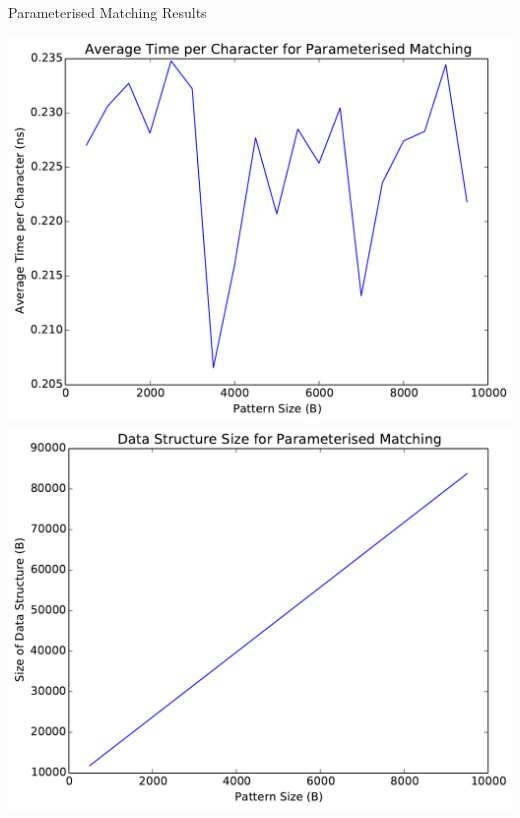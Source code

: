 \documentclass[ %
                    author={Dominic Moylett},
                supervisor={Dr. Raphael Clifford, Dr. Markus Jalsenius and Dr. Benjamin Sach},
                     title={An Empirical Analysis of Data Streaming Algorithms},
                  subtitle={},
                    degree={MEng},
                      year={2014} ]{poster}
\begin{document}
\begin{frame}{}
\begin{columns}[t]
  \begin{column}{0.422\linewidth}
  \begin{block}{\Large Parameterised Matching Results}
  \begin{center}
  \includegraphics[scale=0.6]{parameterised_run_time}\includegraphics[scale=0.6]{parameterised_size}
  \end{center}
  \end{block}
  \end{column}


\end{columns}
\end{frame}
\end{document}
